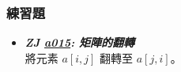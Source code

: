 \subsubsection*{練習題}
\begin{itemize}[label={\Checkmark}]
\item \textbf{\textit{ZJ \href{http://zerojudge.tw/ShowProblem?problemid=a015}{a015}: 矩陣的翻轉}}\\
將元素 $a[i,j]$ 翻轉至 $a[j,i]$。
\end{itemize}